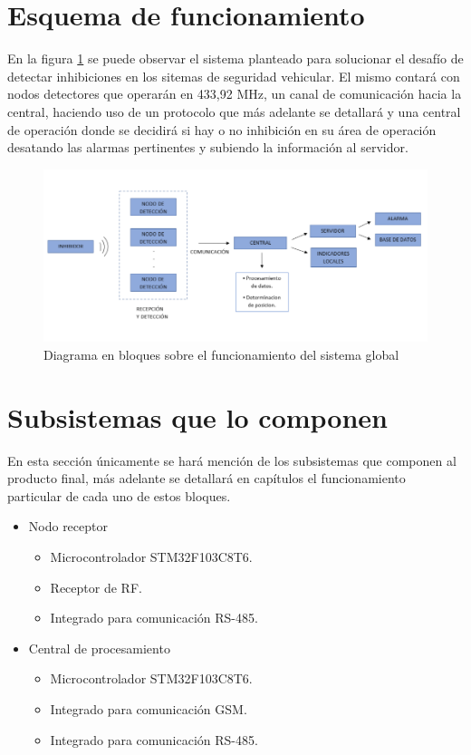 \documentclass[12pt]{report}
\begin{document}
\section{Esquema de funcionamiento}

En la figura \ref{bloques_funcionamiento} se puede observar el sistema planteado para solucionar el desafío de detectar inhibiciones en los sitemas
de seguridad vehicular. El mismo contará con nodos detectores que operarán en 433,92 MHz, un canal de comunicación hacia la central, haciendo
uso de un protocolo que más adelante se detallará y una central de operación donde se decidirá si hay o no inhibición en su área de operación
desatando las alarmas pertinentes y subiendo la información al servidor. \par

\begin{figure}[htb]
	\centering
	\includegraphics[scale=0.53]{bloques_funcionamiento.png}
    \caption{Diagrama en bloques sobre el funcionamiento del sistema global}
	\label{bloques_funcionamiento}
\end{figure}

\section{Subsistemas que lo componen}

En esta sección únicamente se hará mención de los subsistemas que componen al producto final, más adelante se detallará en capítulos el funcionamiento 
particular de cada uno de estos bloques.

\begin{itemize}
    \item Nodo receptor 
    \begin{itemize}
          \item Microcontrolador STM32F103C8T6.
          \item Receptor de RF. 
          \item Integrado para comunicación RS-485.
    \end{itemize}
    \item Central de procesamiento 
    \begin{itemize}
          \item Microcontrolador STM32F103C8T6.
          \item Integrado para comunicación GSM. 
          \item Integrado para comunicación RS-485.
    \end{itemize}
    
\end{itemize}




\pagebreak
\end{document}
